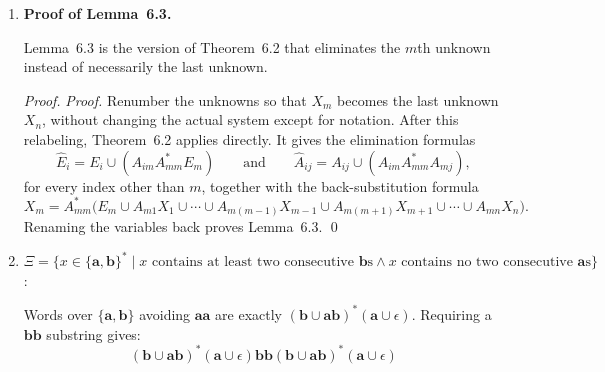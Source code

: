\begin{enumerate}[{6.}1.]
\begin{enumerate}[(a)]
  \item \textbf{Image of \NSIG\ under $\bar{s}$ need not be in $\mathfrak{N}_\Gamma$.}

  Let
  \[
  L=\{x\in\{\pmb{a},\pmb{b}\}^*\mid |x|_{\pmb{a}}=|x|_{\pmb{b}}\}\in\NSIG.
  \]
  Define the substitution by
  $s(\pmb{a})=(\pmb{a}\cup\pmb{b})$ and
  $s(\pmb{b})=(\pmb{a}\cup\pmb{b})$.  Every word in $L$ has even length, so
  every word in $\overline{s}(L)$ also has even length.  Thus
  $\overline{s}(L)$ is contained in the set of even-length words.

  Conversely, let $y$ be any even-length word, say $|y|=2n$.  Choose
  $x=\pmb{a}^n\pmb{b}^n\in L$.  Since each letter of $x$ may be replaced by
  either $\pmb{a}$ or $\pmb{b}$, the word $y$ belongs to $\overline{s}(x)$.
  Hence every even-length word lies in $\overline{s}(L)$.

  Therefore $\overline{s}(L)$ is exactly the set of all even-length words over
  $\{\pmb{a},\pmb{b}\}$, which is regular.  So the image of a nonregular
  language under a substitution need not remain in $\mathfrak{N}_\Gamma$.
\end{enumerate}

\item \textbf{Proof of Lemma~6.3.}

Lemma~6.3 is the version of Theorem~6.2 that eliminates the $m$th unknown
instead of necessarily the last unknown.

\begin{proof}
\emph{Proof.}  Renumber the unknowns so that $X_m$ becomes the last unknown
$X_n$, without changing the actual system except for notation.  After this
relabeling, Theorem~6.2 applies directly.  It gives the elimination formulas
\[
\hat{E}_i=E_i\cup(A_{im}A_{mm}^*E_m)
\qquad\text{and}\qquad
\hat{A}_{ij}=A_{ij}\cup(A_{im}A_{mm}^*A_{mj}),
\]
for every index other than $m$, together with the back-substitution formula
\[
X_m=A_{mm}^*\bigl(E_m\cup A_{m1}X_1\cup\cdots\cup A_{m(m-1)}X_{m-1}
\cup A_{m(m+1)}X_{m+1}\cup\cdots\cup A_{mn}X_n\bigr).
\]
Renaming the variables back proves Lemma~6.3. \qed
\end{proof}

\item $\Xi=\{x\in\{\pmb{a},\pmb{b}\}^*\mid x\text{ contains at least two consecutive }\pmb{b}\text{s}\wedge x\text{ contains no two consecutive }\pmb{a}\text{s}\}$:

Words over $\{\pmb{a},\pmb{b}\}$ avoiding $\pmb{aa}$ are exactly
$(\pmb{b}\cup\pmb{ab})^*(\pmb{a}\cup\epsilon)$.  Requiring a $\pmb{bb}$
substring gives:
\[
  (\pmb{b}\cup\pmb{ab})^*(\pmb{a}\cup\epsilon)\pmb{bb}(\pmb{b}\cup\pmb{ab})^*(\pmb{a}\cup\epsilon)
\]


\end{enumerate}
